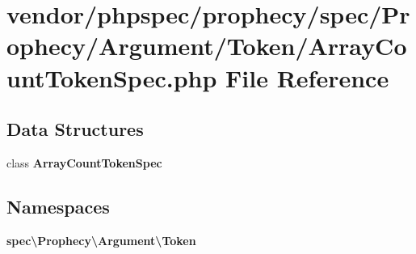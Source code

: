 \section{vendor/phpspec/prophecy/spec/\+Prophecy/\+Argument/\+Token/\+Array\+Count\+Token\+Spec.php File Reference}
\label{_array_count_token_spec_8php}
\subsection*{Data Structures}
\begin{DoxyCompactItemize}
\item 
class {\bf Array\+Count\+Token\+Spec}
\end{DoxyCompactItemize}
\subsection*{Namespaces}
\begin{DoxyCompactItemize}
\item 
 {\bf spec\textbackslash{}\+Prophecy\textbackslash{}\+Argument\textbackslash{}\+Token}
\end{DoxyCompactItemize}
